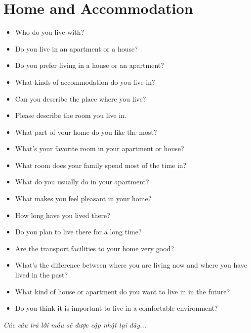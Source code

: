 \section{Home and Accommodation}
\begin{ieltsprompt}
\begin{itemize}[itemsep=4pt]
    \item Who do you live with?
    \item Do you live in an apartment or a house?
    \item Do you prefer living in a house or an apartment?
    \item What kinds of accommodation do you live in?
    \item Can you describe the place where you live?
    \item Please describe the room you live in.
    \item What part of your home do you like the most?
    \item What's your favorite room in your apartment or house?
    \item What room does your family spend most of the time in?
    \item What do you usually do in your apartment?
    \item What makes you feel pleasant in your home?
    \item How long have you lived there?
    \item Do you plan to live there for a long time?
    \item Are the transport facilities to your home very good?
    \item What's the difference between where you are living now and where you have lived in the past?
    \item What kind of house or apartment do you want to live in in the future?
    \item Do you think it is important to live in a comfortable environment?
\end{itemize}
\end{ieltsprompt}

\vspace{1em}
\textit{Các câu trả lời mẫu sẽ được cập nhật tại đây...}
\vspace{2em}


